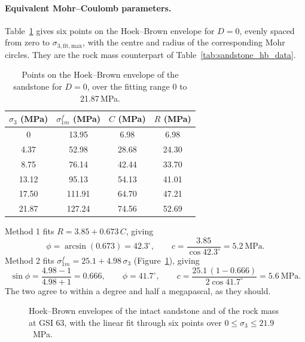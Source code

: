 \paragraph{Equivalent Mohr--Coulomb parameters.}
Table~\ref{tab:example} gives six points on the Hoek--Brown envelope for
\(D = 0\), evenly spaced from zero to \(\sigma_{3,\mathrm{fit,max}}\), with
the centre and radius of the corresponding Mohr circles. They are the rock
mass counterpart of Table~\ref{tab:sandstone_hb_data}.

\begin{table}[htbp]
\caption{Points on the Hoek--Brown envelope of the sandstone for $D = 0$, over
the fitting range 0 to 21.87\,MPa.}
\label{tab:example}
\centering
\small
\begin{tabular}{c c c c}
\toprule
\(\sigma_3\) (MPa) & \(\sigma_{1m}^f\) (MPa) & \(C\) (MPa) & \(R\) (MPa) \\
\midrule
0 & 13.95 & 6.98 & 6.98 \\
4.37 & 52.98 & 28.68 & 24.30 \\
8.75 & 76.14 & 42.44 & 33.70 \\
13.12 & 95.13 & 54.13 & 41.01 \\
17.50 & 111.91 & 64.70 & 47.21 \\
21.87 & 127.24 & 74.56 & 52.69 \\
\bottomrule
\end{tabular}
\end{table}

Method 1 fits \(R = 3.85 + 0.673\,C\), giving
\[
\phi = \arcsin(0.673) = 42.3^\circ ,
\qquad
c = \frac{3.85}{\cos 42.3^\circ} = 5.2~\text{MPa} .
\]
Method 2 fits \(\sigma_{1m}^f = 25.1 + 4.98\,\sigma_3\)
(Figure~\ref{fig:hb-envelope-sandstone}), giving
\[
\sin\phi=
\frac{4.98-1}{4.98+1}
=
0.666 ,
\qquad
\phi = 41.7^\circ ,
\qquad
c=
\frac{25.1\,(1-0.666)}
{2\cos 41.7^\circ}
=
5.6~\text{MPa} .
\]
The two agree to within a degree and half a megapascal, as they should.

\begin{figure}[htbp]
\centering
{}
\caption{Hoek--Brown envelopes of the intact sandstone and of the rock mass at GSI 63, with the linear fit through six points over $0 \le \sigma_3 \le 21.9$~MPa.}
\label{fig:hb-envelope-sandstone}
\end{figure}

